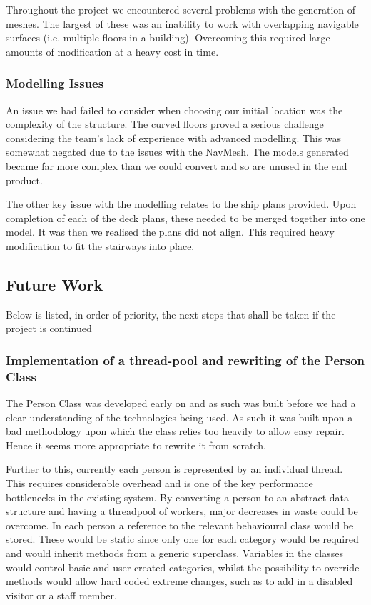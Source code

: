 Throughout the project we encountered several problems with the generation
of meshes. The largest of these was an inability to work with overlapping
navigable surfaces (i.e. multiple floors in a building). Overcoming
this required large amounts of modification at a heavy cost in time.


\subsubsection*{Modelling Issues}

An issue we had failed to consider when choosing our initial location
was the complexity of the structure. The curved floors proved a serious
challenge considering the team's lack of experience with advanced modelling.
This was somewhat negated due to the issues with the NavMesh. The
models generated became far more complex than we could convert and
so are unused in the end product.

The other key issue with the modelling relates to the ship plans provided.
Upon completion of each of the deck plans, these needed to be merged
together into one model. It was then we realised the plans did not
align. This required heavy modification to fit the stairways into
place.


\subsection{Future Work}

Below is listed, in order of priority, the next steps that shall be taken
if the project is continued


\subsubsection*{Implementation of a thread-pool and rewriting of the Person Class}

The Person Class was developed early on and as such was built before
we had a clear understanding of the technologies being used. As such
it was built upon a bad methodology upon which the class relies too
heavily to allow easy repair. Hence it seems more appropriate to rewrite
it from scratch.

Further to this, currently each person is represented by an individual
thread. This requires considerable overhead and is one of the key
performance bottlenecks in the existing system. By converting a person
to an abstract data structure and having a threadpool of workers, major
decreases in waste could be overcome. In each person a reference to the 
relevant behavioural class would be stored. These would be static
since only one for each category would be required and would inherit
methods from a generic superclass. Variables in the classes would
control basic and user created categories, whilst the possibility
to override methods would allow hard coded extreme changes, such as
to add in a disabled visitor or a staff member.

